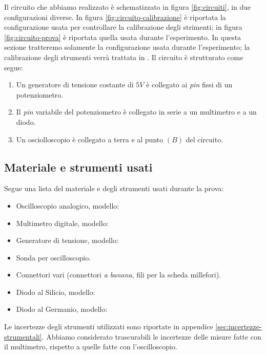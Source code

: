 \documentclass[11pt, a4paper, twoside]{article}
\begin{document}
    Il circuito che abbiamo realizzato è schematizzato in figura \ref{fig:circuiti}, in due configurazioni diverse. In figura \ref{fig:circuito-calibrazione}
    è riportata la configurazione usata per controllare la calibrazione degli strimenti; in figura \ref{fig:circuito-prova}
    è riportata quella usata durante l'esperimento. In questa sezione tratteremo solamente la configurazione usata durante l'esperimento;
    la calibrazione degli strumenti verrà trattata in %
    . Il circuito è strutturato come segue:
    \begin{enumerate}
      \item%
        Un generatore di tensione costante di $5V$ è collegato ai \emph{pin} fissi di un potenziometro.
      \item%
        Il \emph{pin} variabile del potenziometro è collegato in serie a un multimetro e a un diodo.
      \item%
        Un osciolloscopio è collegato a terra e al punto $(B)$ del circuito. 
    \end{enumerate}

  \subsection{Materiale e strumenti usati}\label{subsec:materiali}
    Segue una lista del materiale e degli strumenti usati durante la prova:
      \begin{itemize}
        \item%
          Oscilloscopio analogico, modello: %
        \item%
          Multimetro digitale, modello: %
        \item%
          Generatore di tensione, modello: %
        \item%
          Sonda per oscilloscopio.
        \item%
          Connettori vari (connettori \emph{a banana}, fili per la scheda millefori).
        \item%
          Diodo al Silicio, modello: %
        \item%
          Diodo al Germanio, modello: %
      \end{itemize}
    Le incertezze degli strumenti utilizzati sono riportate in appendice \ref{sec:incertezze-strumentali}.
    Abbiamo considerato trascurabili le incertezze delle misure fatte con il multimetro, rispetto a quelle fatte con l'oscilloscopio.
\end{document}
